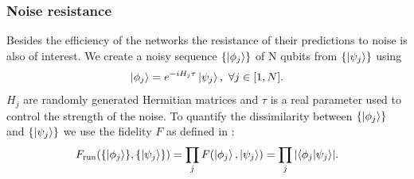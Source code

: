 \subsubsection{Noise resistance}
Besides the efficiency of the networks the resistance of their predictions to noise is also of interest.
We create a noisy sequence $\{\ket{\phi_j}\}$ of N qubits from $\{\ket{\psi_j}\}$ using
\begin{align*}
	\ket{\phi_j} = e^{-i H_j \tau} \ket{\psi_j}, \ \forall j \in [1, N].
\end{align*}
$H_j$ are randomly generated Hermitian matrices and $\tau$ is a real parameter used to control the strength of the noise.
To quantify the dissimilarity between $\{\ket{\phi_j}\}$ and $\{\ket{\psi_j}\}$ we use the fidelity $F$ as defined in \cite{10.5555/1972505}:
\begin{align*}
	F_{\text{run}}(\{\ket{\phi_j}\}, \{\ket{\psi_j}\}) = \prod_j F(\ket{\phi_j}, \ket{\psi_j}) = \prod_j \abs{\bra{\phi_j}\ket{\psi_j}}.
\end{align*}

